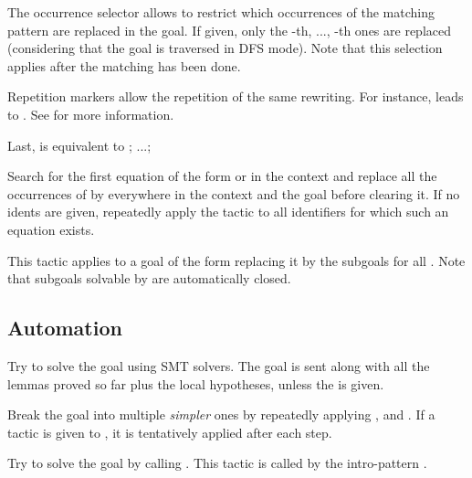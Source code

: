   \smallskip
  
  The occurrence selector  allows to restrict which occurrences
  of the matching pattern are replaced in the goal. If given, only the
  -th, ..., -th ones are replaced (considering that the goal is
  traversed in DFS mode). Note that this selection applies after the matching has
  been done.
  
  \medskip
  
  Repetition markers allow the repetition of the same rewriting. For instance,
  \tacname{}  leads to  \tacname{} . See  for
  more information.
  
  \medskip

  Last, \tacname{}  is equivalent to
  \tacname{} ; ...; \tacname{} 
  
Search for the first equation of the form  or  in the context
 and replace all the occurrences of  by  everywhere in the context and the
 goal before clearing it. If no idents are given, repeatedly apply the tactic to
 all identifiers for which such an equation exists.

This tactic applies to a goal of the form 
 replacing it by  the subgoals  for all . Note that subgoals
 solvable by  are automatically closed.


\subsection{Automation}

Try to solve the goal using SMT solvers. The goal is sent along with all the
 lemmas proved so far plus the local hypotheses, unless the  is
 given.
 
 \noindent\begin{center}
 \end{center}

Break the goal into multiple \emph{simpler} ones by repeatedly applying
,  and . If a tactic is given to \tacname{},
it is tentatively applied after each step.


Try to solve the goal by calling .
This tactic is called by the intro-pattern \ec{//}.
